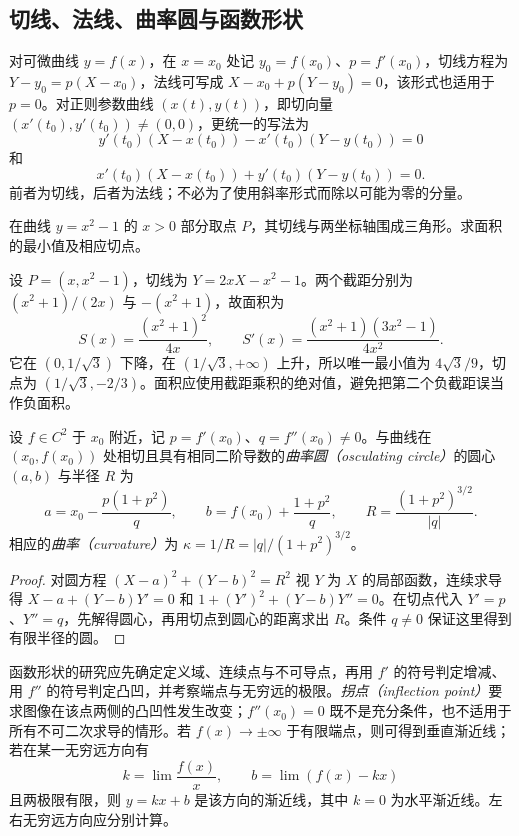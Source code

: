\subsection{切线、法线、曲率圆与函数形状}

对可微曲线 $y=f(x)$，在 $x=x_0$ 处记 $y_0=f(x_0)$、$p=f'(x_0)$，切线方程为 $Y-y_0=p(X-x_0)$，法线可写成 $X-x_0+p(Y-y_0)=0$，该形式也适用于 $p=0$。对正则参数曲线 $(x(t),y(t))$，即切向量 $(x'(t_0),y'(t_0))\ne(0,0)$，更统一的写法为
\[
 y'(t_0)(X-x(t_0))-x'(t_0)(Y-y(t_0))=0
\]
和
\[
 x'(t_0)(X-x(t_0))+y'(t_0)(Y-y(t_0))=0.
\]
前者为切线，后者为法线；不必为了使用斜率形式而除以可能为零的分量。

\begin{example}
\label{ex:pei-diff-tangent-triangle}
在曲线 $y=x^2-1$ 的 $x>0$ 部分取点 $P$，其切线与两坐标轴围成三角形。求面积的最小值及相应切点。
\end{example}
\begin{solve}
设 $P=(x,x^2-1)$，切线为 $Y=2xX-x^2-1$。两个截距分别为 $(x^2+1)/(2x)$ 与 $-(x^2+1)$，故面积为
\[
 S(x)=\frac{(x^2+1)^2}{4x},\qquad
 S'(x)=\frac{(x^2+1)(3x^2-1)}{4x^2}.
\]
它在 $(0,1/\sqrt3)$ 下降，在 $(1/\sqrt3,+\infty)$ 上升，所以唯一最小值为 $4\sqrt3/9$，切点为 $(1/\sqrt3,-2/3)$。面积应使用截距乘积的绝对值，避免把第二个负截距误当作负面积。
\end{solve}

\begin{proposition}[曲率圆]
\label{prop:pei-diff-osculating-circle}
设 $f\in C^2$ 于 $x_0$ 附近，记 $p=f'(x_0)$、$q=f''(x_0)\ne0$。与曲线在 $(x_0,f(x_0))$ 处相切且具有相同二阶导数的\emph{曲率圆（osculating circle）}的圆心 $(a,b)$ 与半径 $R$ 为
\[
 a=x_0-\frac{p(1+p^2)}q,\qquad
 b=f(x_0)+\frac{1+p^2}q,\qquad
 R=\frac{(1+p^2)^{3/2}}{|q|}.
\]
相应的\emph{曲率（curvature）}为 $\kappa=1/R=|q|/(1+p^2)^{3/2}$。
\end{proposition}
\begin{proof}
对圆方程 $(X-a)^2+(Y-b)^2=R^2$ 视 $Y$ 为 $X$ 的局部函数，连续求导得
$X-a+(Y-b)Y'=0$ 和 $1+(Y')^2+(Y-b)Y''=0$。在切点代入 $Y'=p$、$Y''=q$，先解得圆心，再用切点到圆心的距离求出 $R$。条件 $q\ne0$ 保证这里得到有限半径的圆。
\end{proof}

函数形状的研究应先确定定义域、连续点与不可导点，再用 $f'$ 的符号判定增减、用 $f''$ 的符号判定凸凹，并考察端点与无穷远的极限。\emph{拐点（inflection point）}要求图像在该点两侧的凸凹性发生改变；$f''(x_0)=0$ 既不是充分条件，也不适用于所有不可二次求导的情形。若 $f(x)\to\pm\infty$ 于有限端点，则可得到垂直渐近线；若在某一无穷远方向有
\[
 k=\lim\frac{f(x)}x,\qquad b=\lim(f(x)-kx)
\]
且两极限有限，则 $y=kx+b$ 是该方向的渐近线，其中 $k=0$ 为水平渐近线。左右无穷远方向应分别计算。

